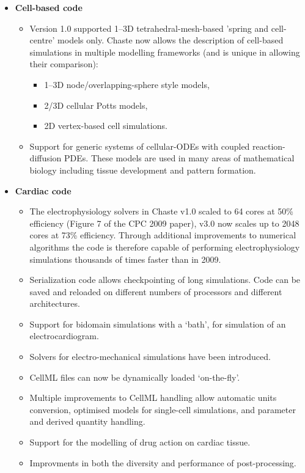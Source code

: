 \documentclass{oxcsletter}
\begin{document}
\begin{letter}{}
\begin{itemize}
 \item \textbf{Cell-based code}
 \begin{itemize}
  \item Version 1.0 supported 1--3D tetrahedral-mesh-based 'spring and cell-centre' models only. 
Chaste now allows the description of cell-based simulations in multiple modelling frameworks (and is unique in allowing their comparison):
\begin{itemize}
 \item 1--3D node/overlapping-sphere style models,
 \item 2/3D cellular Potts models,
 \item 2D vertex-based cell simulations.
\end{itemize}
 \item Support for generic systems of cellular-ODEs with coupled reaction-diffusion PDEs. These models are used in many areas of mathematical biology including tissue development and pattern formation.

 \end{itemize}
 \item \textbf{Cardiac code}
 \begin{itemize}
  \item The electrophysiology solvers in Chaste v1.0 scaled to 64 cores at 50\% efficiency (Figure 7 of the CPC 2009 paper), v3.0 now scales up to 2048 cores at 73\% efficiency.
  Through additional improvements to numerical algorithms the code is therefore capable of performing electrophysiology simulations thousands of times faster than in 2009.
  \item Serialization code allows checkpointing of long simulations. 
  Code can be saved and reloaded on different numbers of processors and different architectures.
  \item Support for bidomain simulations with a `bath', for simulation of an electrocardiogram.
  \item Solvers for electro-mechanical simulations have been introduced.
  \item CellML files can now be dynamically loaded `on-the-fly'.
  \item Multiple improvements to CellML handling allow automatic units conversion, optimised models for single-cell simulations, and parameter and derived quantity handling.
  \item Support for the modelling of drug action on cardiac tissue.
  \item Improvments in both the diversity and performance of post-processing.
 \end{itemize}
\end{itemize}


\end{letter}
\end{document}
